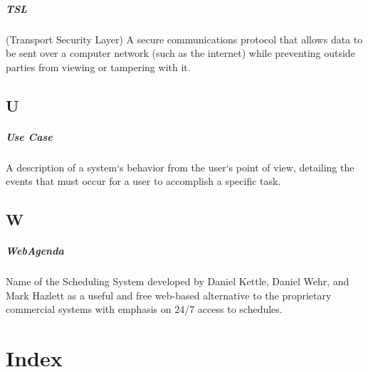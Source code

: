 \documentclass[letterpaper,12pt]{report}
\begin{document}
\paragraph{TSL} (Transport Security Layer) A secure communications protocol that allows data to be sent over a computer network (such as the internet) while preventing outside parties from viewing or tampering with it.
\section*{U}
\paragraph{Use Case} A description of a system`s behavior from the user`s point of view, detailing the events that must occur for a user to accomplish a specific task.
\section*{W}
\paragraph{WebAgenda} Name of the Scheduling System developed by Daniel Kettle, Daniel Wehr, and Mark Hazlett as a useful and free web-based alternative to the proprietary commercial systems with emphasis on 24/7 access to schedules.

\chapter{Index}
\printindex
\end{document}
